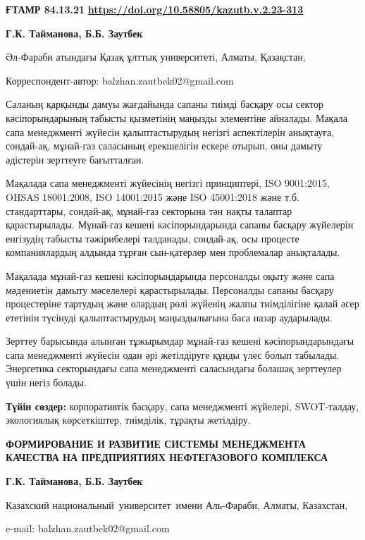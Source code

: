 \newpage
{\bfseries ҒТАМР 84.13.21}
\hfill {\bfseries \href{https://doi.org/10.58805/kazutb.v.2.23-313}{https://doi.org/10.58805/kazutb.v.2.23-313}}


\begin{center}
{\bfseries Г.К. Тайманова, Б.Б. Заутбек\envelope}

Әл-Фараби атындағы Қазақ ұлттық университеті, Алматы, Қазақстан,

\envelope Корреспондент-автор:
balzhan.zautbek02@gmail.com
\end{center}

Саланың қарқынды дамуы жағдайында сапаны тиімді басқару осы сектор
кәсіпорындарының табысты қызметінің маңызды элементіне айналады. Мақала
сапа менеджменті жүйесін қалыптастырудың негізгі аспектілерін анықтауға,
сондай-ақ, мұнай-газ саласының ерекшелігін ескере отырып, оны дамыту
әдістерін зерттеуге бағытталған.

Мақалада сапа менеджменті жүйесінің негізгі принциптері, ISO 9001:2015,
OHSAS 18001:2008, ISO 14001:2015 және ISO 45001:2018 және т.б.
стандарттары, сондай-ақ, мұнай-газ секторына тән нақты талаптар
қарастырылады. Мұнай-газ кешені кәсіпорындарында сапаны басқару
жүйелерін енгізудің табысты тәжірибелері талданады, сондай-ақ, осы
процесте компаниялардың алдында тұрған сын-қатерлер мен проблемалар
анықталады.

Мақалада мұнай-газ кешені кәсіпорындарында персоналды оқыту және сапа
мәдениетін дамыту мәселелері қарастырылады. Персоналды сапаны басқару
процестеріне тартудың және олардың рөлі жүйенің жалпы тиімділігіне қалай
әсер ететінін түсінуді қалыптастырудың маңыздылығына баса назар
аударылады.

Зерттеу барысында алынған тұжырымдар мұнай-газ кешені кәсіпорындарындағы
сапа менеджменті жүйесін одан әрі жетілдіруге құнды үлес болып табылады.
Энергетика секторындағы сапа менеджменті саласындағы болашақ зерттеулер
үшін негіз болады.

{\bfseries Түйін сөздер:} корпоративтік басқару, сапа менеджменті жүйелері,
SWOT-талдау, экологиялық көрсеткіштер, тиімділік, тұрақты жетілдіру.

\begin{center}
{\large\bfseries ФОРМИРОВАНИЕ И РАЗВИТИЕ СИСТЕМЫ МЕНЕДЖМЕНТА КАЧЕСТВА НА
ПРЕДПРИЯТИЯХ НЕФТЕГАЗОВОГО КОМПЛЕКСА}

{\bfseries Г.К. Тайманова, Б.Б. Заутбек\envelope}

Казахский национальный~университет~имени Аль-Фараби, Алматы, Казахстан,

e-mail: balzhan.zautbek02@gmail.com
\end{center}


